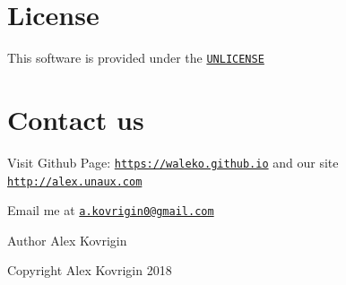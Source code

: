 \hypertarget{index_lic}{}\section{License}\label{index_lic}
This software is provided under the \href{http://unlicense.org}{\tt U\+N\+L\+I\+C\+E\+N\+SE}\hypertarget{index_contact}{}\section{Contact us}\label{index_contact}
Visit Github Page\+: \href{https://waleko.github.io}{\tt https\+://waleko.\+github.\+io} and our site \href{http://alex.unaux.com}{\tt http\+://alex.\+unaux.\+com}

Email me at \href{mailto:a.kovrigin0@gmail.com}{\tt a.\+kovrigin0@gmail.\+com}

\begin{DoxyAuthor}{Author}
Alex Kovrigin 
\end{DoxyAuthor}
\begin{DoxyCopyright}{Copyright}
Alex Kovrigin 2018  
\end{DoxyCopyright}
